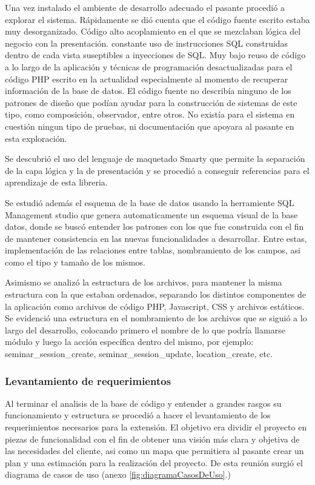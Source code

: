 Una vez instalado el ambiente de desarrollo adecuado el pasante procedió a explorar el sistema. Rápidamente se dió cuenta que el código fuente escrito estaba muy desorganizado. Código alto acoplamiento en el que se mezclaban lógica del negocio con la presentación. constante uso de instrucciones SQL construidas dentro de cada vista suseptibles a inyecciones de SQL. Muy bajo reuso de código a lo largo de la aplicación y técnicas de programación desactualizadas para el código PHP escrito en la actualidad especialmente al momento de recuperar información de la base de datos. El código fuente no describía ninguno de los patrones de diseño que podían ayudar para la construcción de sistemas de este tipo, como composición, observador, entre otros. No existía para el sistema en cuestión ningun tipo de pruebas, ni documentación que apoyara al pasante en esta exploración.

Se descubrió el uso del lenguaje de maquetado Smarty que permite la separación de la capa lógica y la de presentación y se procedió a conseguir referencias para el aprendizaje de esta libreria.

Se estudió además el esquema de la base de datos usando la herramiente SQL Management studio que genera automaticamente un esquema visual de la base datos, donde se buscó entender los patrones con los que fue construida con el fin de mantener consistencia en las nuevas funcionalidades a desarrollar. Entre estas, implementación de las relaciones entre tablas, nombramiento de los campos, asi como el tipo y tamaño de los mismos.

Asimismo se analizó la estructura de los archivos, para mantener la misma estructura con la que estaban ordenados, separando los distintos componentes de la aplicación como archivos de código PHP, Javascript, CSS y archivos estáticos. Se evidenció una estructura en el nombramiento de los archivos que se siguió a lo largo del desarrollo, colocando primero el nombre de lo que podría llamarse módulo y luego la acción específica dentro del mismo, por ejemplo: seminar\_session\_create, seminar\_session\_update, location\_create, etc.

\subsubsection{Levantamiento de requerimientos}

Al terminar el analisis de la base de código y entender a grandes rasgos su funcionamiento y estructura se procedió a hacer el levantamiento de los requerimientos necesarios para la extensión. El objetivo era dividir el proyecto en piezas de funcionalidad con el fin de obtener una visión más clara y objetiva de las necesidades del cliente, asi como un mapa que permitiera al pasante crear un plan y una estimación para la realización del proyecto. De esta reunión surgió el diagrama de casos de uso (anexo \ref{fig:diagramaCasosDeUso}.)

